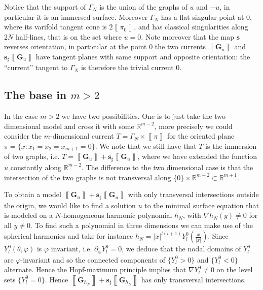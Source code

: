 \documentclass[reqno]{amsart}
\theoremstyle{definition}
\theoremstyle{remark}
\numberwithin{equation}{section}
\newcommand{\R}{\mathbb{R}}
\newcommand{\bG}{\mathbf{G}} %
\def\a#1{\left\llbracket{#1}\right\rrbracket}
\begin{document}
Notice that the support of $\Gamma_N$ is the union of the graphs of $u$ and $-u$, in particular it is an immersed surface. Moreover $\Gamma_N$ has a flat singular point at $0$, where its varifold tangent cone is $2\a{\pi_0}$, and has classical singularities along $2N$ half-lines, that is on the set where $u=0$. Note moreover that the map $\mathbf{s}$ reverses orientation, in particular at the point $0$ the two currents $\a{\bG_u}$ and $\boldsymbol{s}_\sharp \a{\mathbf{G}_u}$ have tangent planes with same support and opposite orientation: the ``current'' tangent to $\Gamma_N$ is therefore the trivial current $0$.

\subsection{The base in $m>2$}\label{subsec.base m>2}
In the case $m>2$ we have two possibilities.  One is to just take the two dimensional model and cross it with some $\R^{m-2}$, more precisely we  could consider the $m$-dimensional current $T=\Gamma_N \times \a{\pi}$ for the oriented plane $\pi= \{x: x_1=x_2= x_{m+1} =0\}$. We note that we still have that $T$ is the immersion of two graphs, i.e. $T=\a{\bG_u} +\boldsymbol{s}_\sharp \a{\bG_u}$, where we have extended the function $u$ constantly along $\R^{m-2}$. The difference to the two dimensional case is that the intersection of the two graphs is not transversal along $\{0\}\times \R^{m-2} \subset \R^{m+1}$.

To obtain a model $\a{\bG_u}+\boldsymbol{s}_\sharp\a{\bG_u}$ with only transversal intersections outside the origin, we would like to find a solution $u$ to the minimal surface equation that is modeled on a $N$-homogeneous harmonic polynomial $h_N$, with $\nabla h_N(y) \neq 0 $ for all $y \neq 0$. To find such a polynomial in three dimensions we can make use of the spherical harmonics and take for instance $h_N= |x|^{l(l+1)}Y^0_l(\frac{x}{|x|})$. Since $Y^0_l(\theta, \varphi)$ is $\varphi$ invariant, i.e. $\partial_\varphi Y^0_l=0$, we deduce that the nodal domains of $Y^0_l$ are $\varphi$-invariant and so the connected components of $\{Y^0_l>0\}$ and $\{Y^0_l<0\}$ alternate. Hence the Hopf-maximum principle implies that $\nabla Y^0_l\neq 0$ on the level sets $\{Y^0_l=0\}$. Hence $\a{\bG_{h_N}} + \boldsymbol{s}_\sharp \a{\bG_{h_N}}$ has only transversal intersections.
\end{document}
